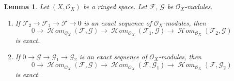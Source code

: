 \documentclass[10pt,a4paper]{amsart}
\theoremstyle{plain}
\newtheorem{lemma}[subsection]{Lemma}
\theoremstyle{definition}
\theoremstyle{remark}
\numberwithin{equation}{subsection}
\def\SheafHom{\mathop{\mathcal{H}\!\mathit{om}}\nolimits}
\begin{document}
\begin{lemma}
\label{lemma-internal-hom-exact}
Let $(X, \mathcal{O}_X)$ be a ringed space.
Let $\mathcal{F}$, $\mathcal{G}$ be $\mathcal{O}_X$-modules.
\begin{enumerate}
\item If $\mathcal{F}_2 \to \mathcal{F}_1 \to \mathcal{F} \to 0$
is an exact sequence of $\mathcal{O}_X$-modules, then
$$
0 \to
\SheafHom_{\mathcal{O}_X}(\mathcal{F}, \mathcal{G}) \to
\SheafHom_{\mathcal{O}_X}(\mathcal{F}_1, \mathcal{G}) \to
\SheafHom_{\mathcal{O}_X}(\mathcal{F}_2, \mathcal{G})
$$
is exact.
\item If $0 \to \mathcal{G} \to \mathcal{G}_1 \to \mathcal{G}_2$
is an exact sequence of $\mathcal{O}_X$-modules, then
$$
0 \to
\SheafHom_{\mathcal{O}_X}(\mathcal{F}, \mathcal{G}) \to
\SheafHom_{\mathcal{O}_X}(\mathcal{F}, \mathcal{G}_1) \to
\SheafHom_{\mathcal{O}_X}(\mathcal{F}, \mathcal{G}_2)
$$
is exact.
\end{enumerate}
\end{lemma}
\end{document}
